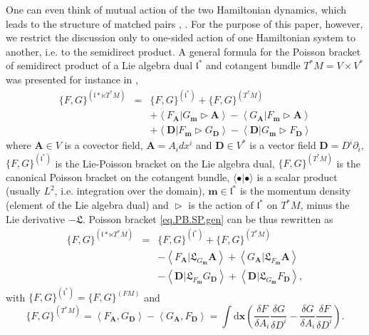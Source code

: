 \documentclass[
10pt, %
a4paper, %
oneside, %
headinclude,footinclude, %
BCOR5mm, %
]{scrartcl}
\newcommand{\xx}{\mathbf{x}}
\newcommand{\dx}{\mathrm{d}\xx}
\newcommand{\mm}{\mathbf{m}}
\renewcommand{\AA}{\mathbf{A}}
\newcommand{\DD}{\mathbf{D}}
\newcommand{\Lie}{\mathfrak{L}}
\newcommand{\Ffunc}{F}
\newcommand{\Gfunc}{G}
\newcommand{\LA}{\mathfrak{l}}
\begin{document}
One can even think of mutual action of the two Hamiltonian dynamics, which leads to the structure of matched pairs \cite{esen2016hamiltonian}, \cite{elmag}. For the purpose of this paper, however, we restrict the discussion only to one-sided action of one Hamiltonian system to another, i.e. to the semidirect product. A general formula for the Poisson bracket of semidirect product of a Lie algebra dual $\LA^*$ and cotangent bundle $T^*M = V\times V^*$ was presented for instance in \cite{elmag, Ogul-matched2,Affro-elchem},
\begin{eqnarray}\label{eq.PB.SP.gen}
	\{\Ffunc,\Gfunc\}^{(\LA*\ltimes T^*M)} &=& \{\Ffunc,\Gfunc\}^{(\LA^*)} + 
	\{\Ffunc,\Gfunc\}^{(T^*M)}\nonumber\\
	&&+\left\langle  \Ffunc_\AA|\Gfunc_\mm \vartriangleright \AA\right\rangle
	-\left\langle  \Gfunc_\AA|\Ffunc_\mm \vartriangleright \AA\right\rangle\nonumber\\
	&&+ \left\langle \DD| \Ffunc_\mm\vartriangleright  \Gfunc_\DD\right\rangle
	- \left\langle \DD| \Gfunc_\mm\vartriangleright  \Ffunc_\DD\right\rangle
\end{eqnarray}
where $\AA\in V$ is a covector field, $\AA = A_i dx^i$ and $\DD\in V^*$ is a vector field $\DD = 
D^i \partial_i$, $\{\Ffunc,\Gfunc\}^{(\LA^*)}$ is the Lie-Poisson bracket on the Lie algebra dual, 
$\{\Ffunc,\Gfunc\}^{(T^*M)}$ is the canonical Poisson bracket on the cotangent bundle, 
$\langle\bullet|\bullet\rangle$ is a scalar product (usually $L^2$, i.e. integration over the 
domain), $\mm\in\LA^*$ is the momentum density (element 
of the Lie algebra dual) and $\vartriangleright$ is the action of $\LA^*$ on $T^*M$,  minus the Lie 
derivative $- \Lie$. Poisson bracket \eqref{eq.PB.SP.gen} can be thus rewritten as
\begin{eqnarray}
	\{\Ffunc,\Gfunc\}^{(\LA*\ltimes T^*M)} &=& \{\Ffunc,\Gfunc\}^{(\LA^*)} + 
	\{\Ffunc,\Gfunc\}^{(T^*M)}\nonumber\\
	&&-\left\langle  \Ffunc_\AA| \Lie_{\Gfunc_\mm} \AA\right\rangle
	+\left\langle  \Gfunc_\AA| \Lie_{\Ffunc_\mm} \AA\right\rangle\nonumber\\
	&&- \left\langle \DD| \Lie_{\Ffunc_\mm}  \Gfunc_\DD\right\rangle
	+ \left\langle \DD| \Lie_{\Gfunc_\mm} \Ffunc_\DD\right\rangle,
\end{eqnarray}
 with $\{\Ffunc,\Gfunc\}^{(\LA^*)} = \{\Ffunc,\Gfunc\}^{(FM)}$ and 
 \begin{equation}
 \{\Ffunc,\Gfunc\}^{(T^*M)} = \left\langle \Ffunc_\AA, \Gfunc_\DD\right\rangle -\left\langle 
 \Gfunc_\AA, \Ffunc_\DD\right\rangle 
 = \int\dx \left(\frac{\delta \Ffunc}{\delta A_i}\frac{\delta \Gfunc}{\delta 
 D^i}-\frac{\delta \Gfunc}{\delta A_i}\frac{\delta \Ffunc}{\delta D^i}\right).
 \end{equation}
\end{document}
